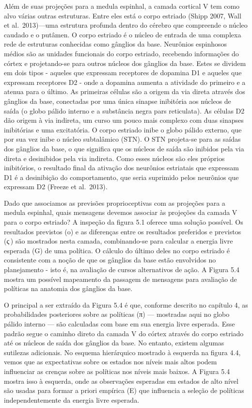 \documentclass[
  12pt,
]{book}
\begin{document}
Além de suas projeções para a medula espinhal, a camada cortical V tem como alvo várias outras estruturas. Entre eles está o corpo estriado (Shipp 2007, Wall et al.~2013)---uma estrutura profunda dentro do cérebro que compreende o núcleo caudado e o putâmen. O corpo estriado é o núcleo de entrada de uma complexa rede de estruturas conhecidas como gânglios da base. Neurônios espinhosos médios são as unidades funcionais do corpo estriado, recebendo informações do córtex e projetando-se para outros núcleos dos gânglios da base. Estes se dividem em dois tipos - aqueles que expressam receptores de dopamina D1 e aqueles que expressam receptores D2 - onde a dopamina aumenta a atividade do primeiro e a atenua para o último. As primeiras células são a origem da via direta através dos gânglios da base, conectadas por uma única sinapse inibitória aos núcleos de saída (o globo pálido interno e a substância negra pars reticulata). As células D2 dão origem à via indireta, um curso um pouco mais complexo com duas sinapses inibitórias e uma excitatória. O corpo estriado inibe o globo pálido externo, que por sua vez inibe o núcleo subtalâmico (STN). O STN projeta-se para as saídas dos gânglios da base, o que significa que os núcleos de saída são inibidos pela via direta e desinibidos pela via indireta. Como esses núcleos são eles próprios inibitórios, o resultado final da ativação dos neurônios estriatais que expressam D1 é a desinibição do comportamento, que seria suprimido pelos neurônios que expressam D2 (Freeze et al.~2013).

Dado que associamos as previsões proprioceptivas com as projeções para a medula espinhal, quais mensagens devemos associar às projeções da camada V para o corpo estriado? A inspeção da figura 5.1 oferece uma solução possível. Os resultados previstos (o) e as diferenças entre os resultados preferidos e previstos (ς ) são mostrados nesta camada, combinando-se para calcular a energia livre esperada (G) de uma política. O cálculo do último deles no corpo estriado é consistente com a noção de que os gânglios da base estão envolvidos no planejamento - isto é, na avaliação de cursos alternativos de ação. A Figura 5.4 mostra um possível mapeamento da passagem de mensagens para avaliação de políticas na anatomia dos gânglios da base.

O principal a ser extraído da Figura 5.4 é que, conforme descrito no capítulo 4, as probabilidades posteriores sobre as políticas (π) --- mostradas aqui no globo pálido interno --- são calculadas com base em sua energia livre esperada. Esse padrão segue o caminho direto da camada V do córtex através do corpo estriado até os núcleos de saída dos gânglios da base. No entanto, existem algumas sutilezas adicionais. No esquema hierárquico mostrado à esquerda na figura 4.4, vemos que as expectativas sobre os estados nos níveis mais altos podem influenciar as crenças sobre as políticas nos níveis mais baixos. A Figura 5.4 mostra isso à esquerda, onde as observações esperadas em estados de alto nível são usadas para formar a priori empírica (E) que influencia a seleção de políticas independentemente da energia livre esperada.
\end{document}
